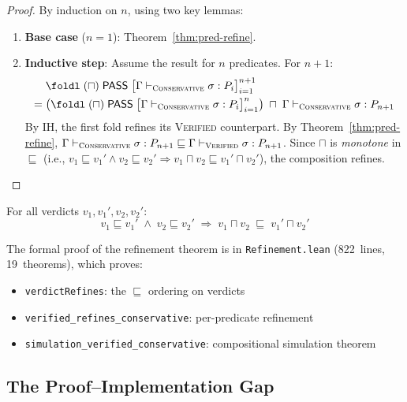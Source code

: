 \documentclass[sigplan,10pt,manuscript,review,anonymous]{acmart}
\newcommand{\PASS}{\ensuremath{\mathsf{PASS}}\xspace}
\newcommand{\tand}{\sqcap}
\newcommand{\seq}{\sigma}
\newcommand{\pred}{P}
\newcommand{\CONSERVATIVE}{\textsc{Conservative}\xspace}
\newcommand{\VERIFIED}{\textsc{Verified}\xspace}
\newcommand{\evalmode}[4]{#1 \vdash_{#2} #3 : #4}
\begin{document}
\begin{proof}
By induction on $n$, using two key lemmas:

\begin{enumerate}[leftmargin=*,itemsep=1pt,topsep=1pt]
\item \textbf{Base case} ($n = 1$):
  Theorem~\ref{thm:pred-refine}.

\item \textbf{Inductive step}:
  Assume the result for $n$ predicates.
  For $n + 1$:
  \begin{align*}
    &\foldl\;(\tand)\;\PASS\;
      \bigl[\evalmode{\Gamma}{\CONSERVATIVE}{\seq}{\pred_i}\bigr]_{i=1}^{n+1}
    \\ =\; &
      \bigl(\foldl\;(\tand)\;\PASS\;
        \bigl[\evalmode{\Gamma}{\CONSERVATIVE}{\seq}{\pred_i}\bigr]_{i=1}^{n}\bigr)
      \;\tand\;
      \evalmode{\Gamma}{\CONSERVATIVE}{\seq}{\pred_{n+1}}
  \end{align*}
  By IH, the first fold refines its \VERIFIED{} counterpart.
  By Theorem~\ref{thm:pred-refine},
  $\evalmode{\Gamma}{\CONSERVATIVE}{\seq}{\pred_{n+1}}
   \sqsubseteq
   \evalmode{\Gamma}{\VERIFIED}{\seq}{\pred_{n+1}}$.
  Since $\tand$ is \emph{monotone} in $\sqsubseteq$ (i.e.,
  $v_1 \sqsubseteq v_1' \wedge v_2 \sqsubseteq v_2'
   \Rightarrow v_1 \tand v_2 \sqsubseteq v_1' \tand v_2'$),
  the composition refines.\qedhere
\end{enumerate}
\end{proof}

\begin{lemma}[$\tand$-monotonicity in $\sqsubseteq$]\label{lem:tand-mono}
For all verdicts $v_1, v_1', v_2, v_2'$:
\[
  v_1 \sqsubseteq v_1' \;\wedge\; v_2 \sqsubseteq v_2'
  \;\Longrightarrow\;
  v_1 \tand v_2 \;\sqsubseteq\; v_1' \tand v_2'
\]
\end{lemma}

The formal proof of the refinement theorem is in
\texttt{Refinement.lean} (822~lines, 19~theorems), which proves:
\begin{itemize}[leftmargin=*,itemsep=0pt,topsep=1pt]
\item \texttt{verdictRefines}: the $\sqsubseteq$ ordering on verdicts
\item \texttt{verified\_refines\_conservative}: per-predicate refinement
\item \texttt{simulation\_verified\_conservative}: compositional
      simulation theorem
\end{itemize}

\subsection{The Proof--Implementation Gap}\label{sec:gap}
\end{document}
